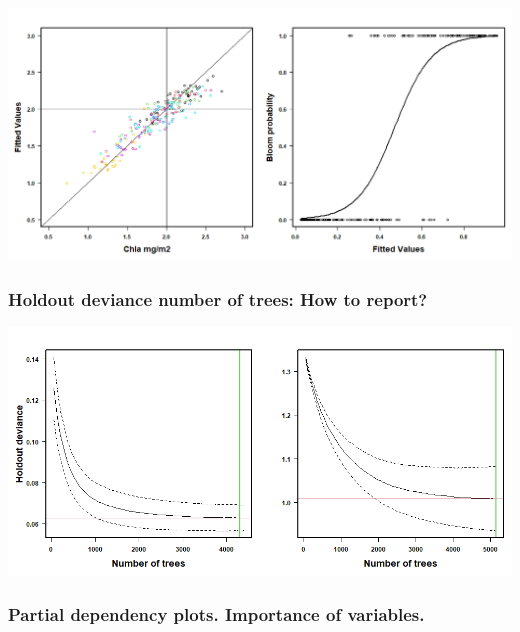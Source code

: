 \documentclass[
]{article}
\let\origfigure\figure
\let\endorigfigure\endfigure
\renewenvironment{figure}[1][2] {
    \expandafter\origfigure\expandafter[H]
} {
    \endorigfigure
}
\begin{document}
\begin{figure}
\includegraphics[width=1\linewidth]{Manuscript_files/FIGURES/Predobs} \caption{A caption}\label{fig:unnamed-chunk-2}
\end{figure}

\hypertarget{holdout-deviance-number-of-trees-how-to-report}{%
\subsubsection{Holdout deviance number of trees: How to
report?}\label{holdout-deviance-number-of-trees-how-to-report}}

\begin{figure}
\includegraphics[width=1\linewidth]{Manuscript_files/FIGURES/Holdout_Dev} \caption{A caption}\label{fig:unnamed-chunk-3}
\end{figure}

\hypertarget{partial-dependency-plots.-importance-of-variables.}{%
\subsubsection{Partial dependency plots. Importance of
variables.}\label{partial-dependency-plots.-importance-of-variables.}}
\end{document}

